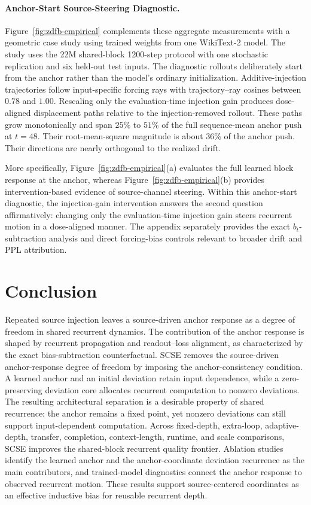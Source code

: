 \documentclass[letterpaper]{article} %
\newcommand{\SCSE}{\textsc{SCSE}}
\theoremstyle{remark}
\begin{document}
\paragraph{Anchor-Start Source-Steering Diagnostic.} Figure~\ref{fig:zdfb-empirical} complements these aggregate measurements with a geometric case study using trained weights from one WikiText-2 model.  The study uses the 22M shared-block 1200-step protocol with one stochastic replication and six held-out test inputs.  The diagnostic rollouts deliberately start from the anchor rather than the model's ordinary initialization.  Additive-injection trajectories follow input-specific forcing rays with trajectory--ray cosines between $0.78$ and $1.00$.  Rescaling only the evaluation-time injection gain produces dose-aligned displacement paths relative to the injection-removed rollout.  These paths grow monotonically and span $25\%$ to $51\%$ of the full sequence-mean anchor push at $t=48$.  Their root-mean-square magnitude is about $36\%$ of the anchor push.  Their directions are nearly orthogonal to the realized drift.

More specifically, Figure~\ref{fig:zdfb-empirical}(a) evaluates the full learned block response at the anchor, whereas Figure~\ref{fig:zdfb-empirical}(b) provides intervention-based evidence of source-channel steering.  Within this anchor-start diagnostic, the injection-gain intervention answers the second question affirmatively: changing only the evaluation-time injection gain steers recurrent motion in a dose-aligned manner.  The appendix separately provides the exact $b_t$-subtraction analysis and direct forcing-bias controls relevant to broader drift and PPL attribution.

\section{Conclusion}
Repeated source injection leaves a source-driven anchor response as a degree of freedom in shared recurrent dynamics.  The contribution of the anchor response is shaped by recurrent propagation and readout--loss alignment, as characterized by the exact bias-subtraction counterfactual.  \SCSE{} removes the source-driven anchor-response degree of freedom by imposing the anchor-consistency condition.  A learned anchor and an initial deviation retain input dependence, while a zero-preserving deviation core allocates recurrent computation to nonzero deviations.  The resulting architectural separation is a desirable property of shared recurrence: the anchor remains a fixed point, yet nonzero deviations can still support input-dependent computation.  Across fixed-depth, extra-loop, adaptive-depth, transfer, completion, context-length, runtime, and scale comparisons, \SCSE{} improves the shared-block recurrent quality frontier.  Ablation studies identify the learned anchor and the anchor-coordinate deviation recurrence as the main contributors, and trained-model diagnostics connect the anchor response to observed recurrent motion.  These results support source-centered coordinates as an effective inductive bias for reusable recurrent depth.
\end{document}
